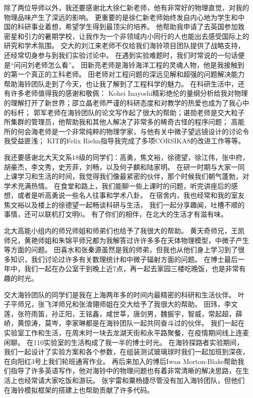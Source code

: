除了两位导师以外，我还要感谢北大徐仁新老师，他有非常好的物理直觉，对我的物理品味产生了深远的影响。
更重要的是徐仁新老师始终发自内心地为学生和中国的科研事业着想，希望学生得到最顶尖的培养。
他帮助我申请了去英国参加致密星和引力的暑期学校，让我作为一个非领域内小同行的人也能出去感受国际上的研究和学术氛围。
交大的刘江来老师不仅给我们海铃项目团队提供了战略支持，还经常切身参与到我们实验讨论中。
在遇到实验难题时，我们时常说的一句话便是“问问刘老师怎么看”。
田新亮老师是海铃海洋工程的灵魂人物，他是我接触到的第一个真正的工科老师。
田老师对工程问题的深远见解和超强的问题解决能力帮助海铃团队走到了今天，也让我了解到了工程科学的魅力。
在科研生活中，还有许多老师值得我的感谢和敬佩：
Kohei Inayoshi精彩绝伦的量纲分析给我对物理的理解打开了新世界；邵立晶老师严谨的科研态度和对教学的热爱也成为了我心中的标杆；
郭军老师在海铃团队的论文写作起了很大的帮助；谌勋老师是交大粒子所集群的管理员，他帮助我和其他人解决了非常多的稀奇古怪的程序问题；
高能所的何会海老师是一个非常纯粹的物理学家，与他有关中微子望远镜设计的讨论令我受益匪浅；
KIT的Felix Riehn指导我完成了多项CORSIKA8的改进工作等等。

我还要感谢北大天文系18级的同学们：高勇，焦文裕，徐德望，徐江伟，张中府，胡豪杰，李文秀，史芳菲，刘畅，以及何子麒和陆家明。
在研一时期与大家一同上课学习和生活的时间，我觉得我们像最紧密的伙伴，那个时候我们朝气蓬勃，对学术充满热情。
在食堂和路上，我们能聊一些上课时的问题，听完讲座后的感想，或者是听高勇说一些名人往事和学术八卦。
在宿舍内，我也经常和我的室友焦文裕以及楼上的徐德望一起畅谈科研与生活，
我们一起分享趣闻，吐槽不顺的事情，还可以联机打文明6。
有了你们的相伴，在北大的生活才有滋有味。

北大高能小组内的师兄师姐和师弟们也给予了我很大的帮助。
黄天奇师兄，王凯师兄，黄艳师姐和朱锦平师兄都为我解答过许许多多在天体物理模型，中微子产生等方面的问题。
田喜水和张秦源虽然是我的师弟，但我也从他们身上学习到了很多知识，我们讨论过许多有关数理统计和中微子辐射方面的问题。
在博士最后一年中，我们一起在办公室干到晚上近7点，再一起去家园三楼吃晚饭，也是非常有趣的时光。

交大海铃团队的同学们是我在上海两年多的时间内最精密的科研和生活伙伴。
叶子平师兄，张飞洋师兄和张淯翎师姐在交大给予了我很大的帮助。
田玮，李文莲，张符雨笛，孙正阳，王铭鑫，咸世莘，唐剑男，魏振宇，智威，常起超，薛峤，黄惊涛，莫岑，李家琳都是在海铃团队一起共同奋斗过的伙伴。
我们一起在实验室工作和生活，在周末时一块去龙湖天街和永平路聚餐，在疫情期间线上连麦闲聊。
在110实验室的生活构成了我一半的博士时光。
在海铃探路者实验期间，我们一起设计了实验方案和各个参数，在组装测试玻璃球时我们一起加班到深夜，在向阳红3号上我们轮班通宵作业。
再后来加入的博后Iwan Morton-Blake帮助我们指导了许多英语写作，他对海铃中的物理问题也有着非常清晰的解决思路，在生活上也经常请大家吃饭和游玩。
张宇雷和粟杨捷尽管没有加入海铃团队，但他们在海铃模拟框架的搭建上也帮助贡献了许多代码。


